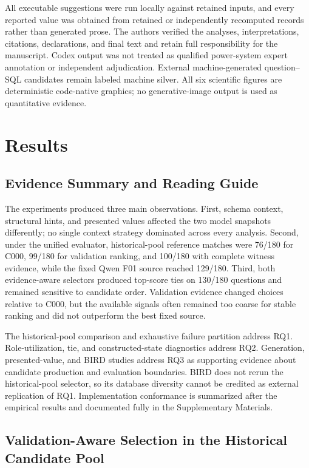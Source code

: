 \documentclass[information,article,submit,moreauthors]{Definitions/mdpi}
\begin{document}
All executable suggestions were run locally against retained inputs, and every reported value was obtained from retained or independently recomputed records rather than generated prose. The authors verified the analyses, interpretations, citations, declarations, and final text and retain full responsibility for the manuscript. Codex output was not treated as qualified power-system expert annotation or independent adjudication. External machine-generated question--SQL candidates remain labeled machine silver. All six scientific figures are deterministic code-native graphics; no generative-image output is used as quantitative evidence.

\section{Results}

\subsection{Evidence Summary and Reading Guide}

The experiments produced three main observations. First, schema context, structural hints, and presented values affected the two model snapshots differently; no single context strategy dominated across every analysis. Second, under the unified evaluator, historical-pool reference matches were 76/180 for C000, 99/180 for validation ranking, and 100/180 with complete witness evidence, while the fixed Qwen F01 source reached 129/180. Third, both evidence-aware selectors produced top-score ties on 130/180 questions and remained sensitive to candidate order. Validation evidence changed choices relative to C000, but the available signals often remained too coarse for stable ranking and did not outperform the best fixed source.

The historical-pool comparison and exhaustive failure partition address RQ1. Role-utilization, tie, and constructed-state diagnostics address RQ2. Generation, presented-value, and BIRD studies address RQ3 as supporting evidence about candidate production and evaluation boundaries. BIRD does not rerun the historical-pool selector, so its database diversity cannot be credited as external replication of RQ1. Implementation conformance is summarized after the empirical results and documented fully in the Supplementary Materials.

\subsection{Validation-Aware Selection in the Historical Candidate Pool}
\end{document}
